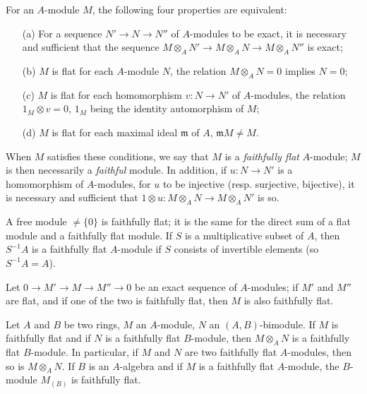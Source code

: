 \begin{env}[6.4.1]
\label{env-0.6.4.1}
For an $A$-module $M$, the following four properties are equivalent:
\begin{itemize}
  \item[(a)] For a sequence $N'\to N\to N''$ of $A$-modules to be exact, it is necessary and
    sufficient that the sequence $M\otimes_A N'\to M\otimes_A N\to M\otimes_A N''$ is exact;
  \item[(b)] $M$ is flat for each $A$-module $N$, the relation $M\otimes_A N=0$ implies $N=0$;
  \item[(c)] $M$ is flat for each homomorphism $v:N\to N'$ of $A$-modules, the relation
    $1_M\otimes v=0$, $1_M$ being the identity automorphism of $M$;
  \item[(d)] $M$ is flat for each maximal ideal $\mathfrak{m}$ of $A$, $\mathfrak{m}M\neq M$.
\end{itemize}

When $M$ satisfies these conditions, we say that $M$ is a {\em faithfully flat} $A$-module;
$M$ is then necessarily a {\em faithful} module. In addition, if $u:N\to N'$ is a
homomorphism of $A$-modules, for $u$ to be injective (resp. surjective, bijective), it is
necessary and sufficient that $1\otimes u:M\otimes_A N\to M\otimes_A N'$ is so.
\end{env}

\begin{env}[6.4.2]
\label{env-0.6.4.2}
A free module $\neq\{0\}$ is faithfully flat; it is the same for the direct sum of a flat
module and a faithfully flat module. If $S$ is a multiplicative subset of $A$, then
$S^{-1}A$ is a faithfully flat $A$-module if $S$ consists of invertible elements
(so $S^{-1}A=A$).
\end{env}

\begin{env}[6.4.3]
\label{env-0.6.4.3}
Let $0\to M'\to M\to M''\to 0$ be an exact sequence of $A$-modules; if $M'$ and $M''$ are
flat, and if one of the two is faithfully flat, then $M$ is also faithfully flat.
\end{env}

\begin{env}[6.4.4]
\label{env-0.6.4.4}
Let $A$ and $B$ be two rings, $M$ an $A$-module, $N$ an $(A,B)$-bimodule. If $M$ is
faithfully flat and if $N$ is a faithfully flat $B$-module, then $M\otimes_A N$ is a
faithfully flat $B$-module. In particular, if $M$ and $N$ are two faithfully flat
$A$-modules, then so is $M\otimes_A N$. If $B$ is an $A$-algebra and if $M$ is a faithfully
flat $A$-module, the $B$-module $M_{(B)}$ is faithfully flat.
\end{env}

